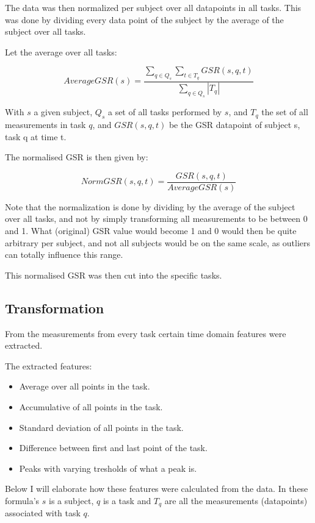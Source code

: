 \documentclass[11pt,leqno,a4paper]{report} %
\begin{document}
The data was then normalized per subject over all datapoints in all tasks. This was done by dividing every data point of the subject by the average of the subject over all tasks. 

Let the average over all tasks:


\[
AverageGSR(s) = \frac 
{\sum_{q \in Q_s}\sum_{t \in T_q} GSR(s,q,t)}
{ \sum_{q \in Q_s} \left\vert{T_q}\right\vert }
\]

With $s$ a given subject, $Q_s$ a set of all tasks performed by $s$, and $T_q$ the set of all measurements in task $q$, and $GSR(s,q,t)$ be the GSR datapoint of subject s, task q at time t.

The normalised GSR is then given by:

\[
NormGSR(s,q,t) = \frac{GSR(s,q,t)}{AverageGSR(s)}
\]

Note that the normalization is done by dividing by the average of the subject over all tasks, and not by simply transforming all measurements to be between 0 and 1. What (original) GSR value would become 1 and 0 would then be quite arbitrary per subject, and not all subjects would be on the same scale, as outliers can totally influence this range.

This normalised GSR was then cut into the specific tasks.

\subsection{Transformation}
From the measurements from every task certain time domain features were extracted. 

The extracted features:

\begin{itemize}

\item Average over all points in the task.
\item Accumulative of all points in the task.
\item Standard deviation of all points in the task.
\item Difference between first and last point of the task.
\item Peaks with varying tresholds of what a peak is.
\end{itemize}

Below I will elaborate how these features were calculated from the data. In these formula's $s$ is a subject, $q$ is a task and $T_q$ are all the measurements (datapoints) associated with task $q$.
\end{document}
